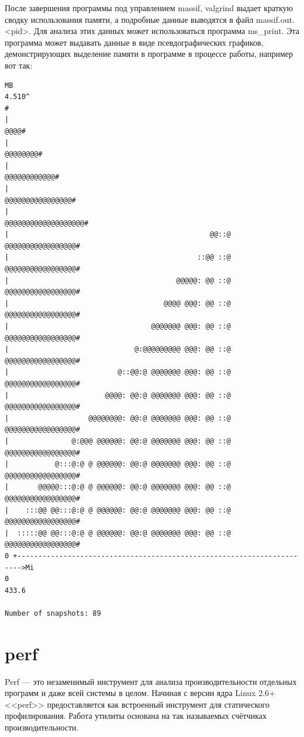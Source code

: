 \documentclass[12pt]{article}
\begin{document}
После завершения программы под управлением massif, valgrind выдает краткую сводку использования памяти, а подробные данные выводятся в файл massif.out.<pid>. Для анализа этих данных может использоваться программа ms\_print. Эта программа может выдавать данные в виде псевдографических  графиков, демонстрирующих выделение памяти в программе в процессе работы, например вот так:
{\scriptsize
\begin{lstlisting}[label=massif,escapechar=!]
    MB
4.510^                                                                  #
|                                                                   @@@@#
|                                                               @@@@@@@@#
|                                                           @@@@@@@@@@@@#
|                                                       @@@@@@@@@@@@@@@@#
|                                                    @@@@@@@@@@@@@@@@@@@#
|                                                @@::@ @@@@@@@@@@@@@@@@@#
|                                             ::@@ ::@ @@@@@@@@@@@@@@@@@#
|                                        @@@@@: @@ ::@ @@@@@@@@@@@@@@@@@#
|                                     @@@@ @@@: @@ ::@ @@@@@@@@@@@@@@@@@#
|                                  @@@@@@@ @@@: @@ ::@ @@@@@@@@@@@@@@@@@#
|                              @:@@@@@@@@@ @@@: @@ ::@ @@@@@@@@@@@@@@@@@#
|                          @::@@:@ @@@@@@@ @@@: @@ ::@ @@@@@@@@@@@@@@@@@#
|                       @@@@: @@:@ @@@@@@@ @@@: @@ ::@ @@@@@@@@@@@@@@@@@#
|                   @@@@@@@@: @@:@ @@@@@@@ @@@: @@ ::@ @@@@@@@@@@@@@@@@@#
|               @:@@@ @@@@@@: @@:@ @@@@@@@ @@@: @@ ::@ @@@@@@@@@@@@@@@@@#
|           @:::@:@ @ @@@@@@: @@:@ @@@@@@@ @@@: @@ ::@ @@@@@@@@@@@@@@@@@#
|       @@@@@:::@:@ @ @@@@@@: @@:@ @@@@@@@ @@@: @@ ::@ @@@@@@@@@@@@@@@@@#
|    :::@@ @@:::@:@ @ @@@@@@: @@:@ @@@@@@@ @@@: @@ ::@ @@@@@@@@@@@@@@@@@#
|  :::::@@ @@:::@:@ @ @@@@@@: @@:@ @@@@@@@ @@@: @@ ::@ @@@@@@@@@@@@@@@@@#
0 +----------------------------------------------------------------------->Mi
0                                                                   433.6

Number of snapshots: 89
\end{lstlisting}
}



\section*{perf}
Perf --- это незаменимый инструмент для анализа производительности отдельных программ и даже всей системы в целом. Начиная с версии ядра  Linux 2.6+ <<perf>> предоставляется как встроенный инструмент для статического профилирования. Работа утилиты основана на так называемых счётчиках производительности.
\end{document}
